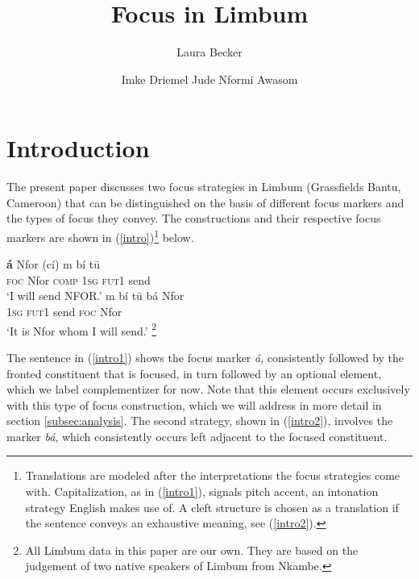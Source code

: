 \documentclass[output=paper,
modfonts
]{langscibook}
\title{Focus in Limbum}
\author{%
Laura Becker\affiliation{Leipzig University}\and 
 Imke Driemel\affiliation{Leipzig University}\lastand 
 Jude Nformi Awasom\affiliation{Leipzig University}
}
\begin{document}
\maketitle

\section{Introduction} 

The present paper discusses two focus strategies in Limbum (Grassfields Bantu, Cameroon) that can be distinguished on the basis of different focus markers and the types of focus they convey. The constructions and their respective focus markers are shown in (\ref{intro})\footnote{Translations are modeled after the interpretations the focus strategies come with. Capitalization, as in (\ref{intro1}), signals pitch accent, an intonation strategy English makes use of. A cleft structure is chosen as a translation if the sentence conveys an exhaustive meaning, see (\ref{intro2}).} below.

\ea \label{intro}
\ea \label{intro1}
\gll \textbf{á}  Nfor (cí) m bí t\=u \\
\textsc{foc} Nfor \textsc{comp} \textsc{1sg} \textsc{fut1} send \\
\glt `I will send NFOR.'
\ex \label{intro2}
\gll m bí t\=u bá Nfor\\
\textsc{1sg} \textsc{fut1} send \textsc{foc} Nfor\\
\glt `It is Nfor whom I will send.' \footnote{All Limbum data in this paper are our own. They are based on the judgement of two native speakers of Limbum from Nkambe.}
\z
\z 


\noindent
The sentence in (\ref{intro1}) shows the focus marker \textit{á}, consistently followed by the fronted constituent that is focused, in turn followed by an optional element, which we label complementizer for now. Note that this element occurs exclusively with this type of focus construction, which we will address in more detail in section \ref{subsec:analysis}. The second strategy, shown in (\ref{intro2}), involves the marker \textit{bá}, which consistently occurs left adjacent to the focused constituent.
 
\end{document}
